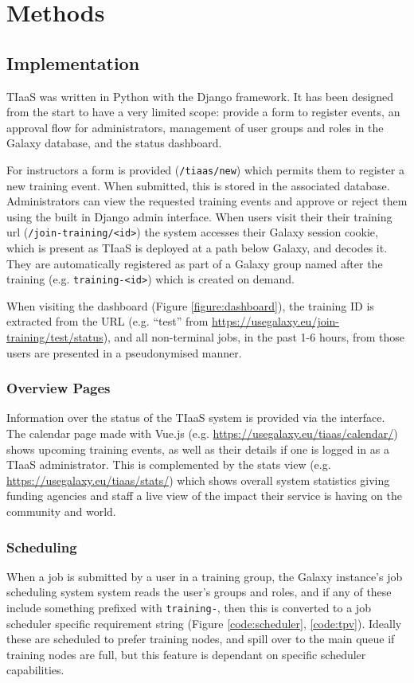 \documentclass[a4paper,num-refs]{oup-contemporary}
\begin{document}
\section{Methods}

\subsection{Implementation}
TIaaS was written in Python with the Django framework. It has been designed from the start to have a very limited scope: provide a form to register events, an approval flow for administrators, management of user groups and roles in the Galaxy database, and the status dashboard.

For instructors a form is provided (\texttt{/tiaas/new}) which permits them to register a new training event. When submitted, this is stored in the associated database. Administrators can view the requested training events and approve or reject them using the built in Django admin interface. When users visit their their training url (\texttt{/join-training/<id>}) the system accesses their Galaxy session cookie, which is present as TIaaS is deployed at a path below Galaxy, and decodes it. They are automatically registered as part of a Galaxy group named after the training (e.g. \texttt{training-<id>}) which is created on demand.

When visiting the dashboard (Figure \ref{figure:dashboard}), the training ID is extracted from the URL (e.g. ``test'' from \url{https://usegalaxy.eu/join-training/test/status}), and all non-terminal jobs, in the past 1-6 hours, from those users are presented in a pseudonymised manner.

\subsubsection{Overview Pages}
Information over the status of the TIaaS system is provided via the interface. The calendar page made with Vue.js (e.g. \url{https://usegalaxy.eu/tiaas/calendar/}) shows upcoming training events, as well as their details if one is logged in as a TIaaS administrator. This is complemented by the stats view (e.g. \url{https://usegalaxy.eu/tiaas/stats/}) which shows overall system statistics giving funding agencies and staff a live view of the impact their service is having on the community and world.

\subsubsection{Scheduling}
When a job is submitted by a user in a training group, the Galaxy instance's job scheduling system system reads the user's groups and roles, and if any of these include something prefixed with \texttt{training-}, then this is converted to a job scheduler specific requirement string (Figure \ref{code:scheduler}, \ref{code:tpv}). Ideally these are scheduled to prefer training nodes, and spill over to the main queue if training nodes are full, but this feature is dependant on specific scheduler capabilities. 
\end{document}
